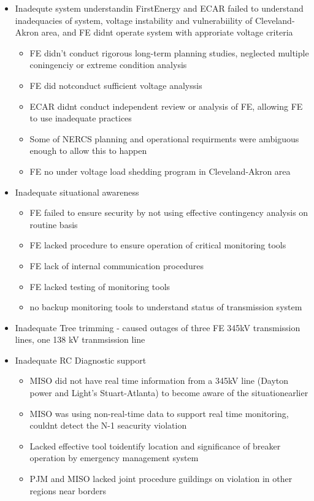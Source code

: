 \begin{itemize}
\item Inadequte system understandin
FirstEnergy and ECAR failed to understand inadequacies of system, voltage instability and vulnerabiility of Cleveland-Akron area, and FE didnt operate system with approriate voltage criteria
\begin{itemize}
\item FE didn't conduct rigorous long-term planning studies, neglected multiple coningenciy or extreme condition analysis
\item FE did notconduct sufficient voltage analyssis
\item ECAR didnt conduct independent review or analysis of FE, allowing FE to use inadequate practices
\item Some of NERCS planning and operational requirments were ambiguous enough to allow this to happen
\item FE no under voltage load shedding program in Cleveland-Akron area
\end{itemize}
\item Inadequate situational awareness
\begin{itemize}
\item FE failed to ensure security by not using effective contingency analysis on routine basis
\item FE lacked procedure to ensure operation of critical monitoring tools
\item FE lack of internal communication procedures
\item FE lacked testing of monitoring tools
\item no backup monitoring tools to understand status of transmission system
\end{itemize}
\item Inadequate Tree trimming
- caused outages of three FE 345kV transmission lines, one 138 kV tranmsission line
\item Inadequate RC Diagnostic support
\begin{itemize}
\item MISO did not have real time information from a 345kV line (Dayton power and Light's Stuart-Atlanta) to become aware of the situationearlier
\item MISO was using non-real-time data to support real time monitoring, couldnt detect the N-1 seacurity violation
\item Lacked effective tool toidentify location and significance of breaker operation by emergency management system
\item PJM and MISO lacked joint procedure guildings on violation in other regions near borders
\end{itemize}
\end{itemize}

